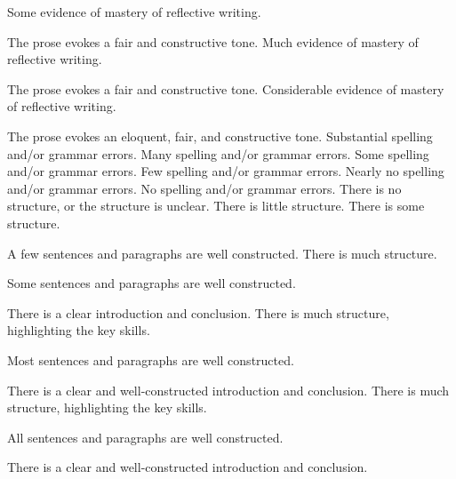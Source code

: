 \documentclass{../../fal_assignment}
\begin{document}
\begin{markingrubric}
        \grade 		Some evidence of mastery of reflective writing.
         \par 		The prose evokes a fair and constructive tone.
        \grade 		Much evidence of mastery of reflective writing.
         \par 		The prose evokes a fair and constructive tone.
        \grade 		Considerable evidence of mastery of reflective writing.
        \par 		The prose evokes an eloquent, fair, and constructive tone.
%
        \grade\fail 	Substantial spelling and/or grammar errors.
        \grade 		Many spelling and/or grammar errors.
        \grade 		Some spelling and/or grammar errors.  
        \grade 		Few spelling and/or grammar errors.
        \grade 		Nearly no spelling and/or grammar errors.
        \grade 		No spelling and/or grammar errors.
%
        \grade\fail 	There is no structure, or the structure is unclear.
        \grade 		There is little structure.
        \grade 		There is some structure.
        \par 		A few sentences and paragraphs are well constructed.
        \grade 		There is much structure.
        \par 		Some sentences and paragraphs are well constructed.
        \par 		There is a clear introduction and conclusion.
        \grade 		There is much structure, highlighting the key skills.
        \par 		Most sentences and paragraphs are well constructed.
        \par 		There is a clear and well-constructed introduction and conclusion.
        \grade 		There is much structure, highlighting the key skills.
        \par 		All sentences and paragraphs are well constructed.
        \par 		There is a clear and well-constructed introduction and conclusion.
\end{markingrubric}
\end{document}

